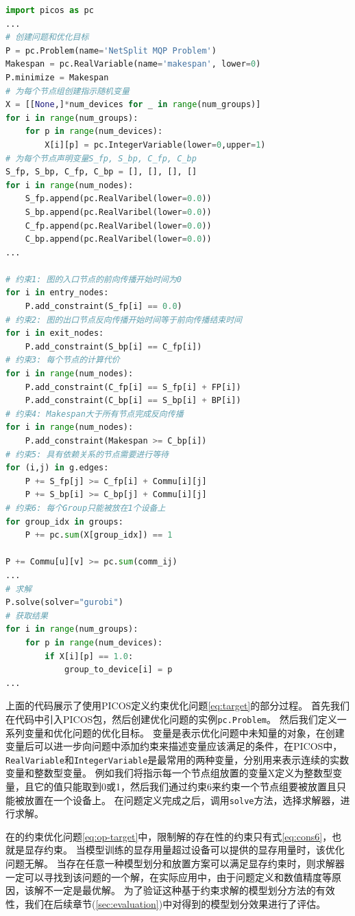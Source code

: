 \begin{lstlisting}[language=Python, caption={约束优化求解的Python实现}]
import picos as pc
...
# 创建问题和优化目标
P = pc.Problem(name='NetSplit MQP Problem')
Makespan = pc.RealVariable(name='makespan', lower=0)
P.minimize = Makespan
# 为每个节点组创建指示随机变量
X = [[None,]*num_devices for _ in range(num_groups)]
for i in range(num_groups):
	for p in range(num_devices):
		X[i][p] = pc.IntegerVariable(lower=0,upper=1)
# 为每个节点声明变量S_fp, S_bp, C_fp, C_bp
S_fp, S_bp, C_fp, C_bp = [], [], [], []
for i in range(num_nodes):
	S_fp.append(pc.RealVaribel(lower=0.0))
	S_bp.append(pc.RealVaribel(lower=0.0))
	C_fp.append(pc.RealVaribel(lower=0.0))
	C_bp.append(pc.RealVaribel(lower=0.0))
...

# 约束1: 图的入口节点的前向传播开始时间为0
for i in entry_nodes:
	P.add_constraint(S_fp[i] == 0.0)
# 约束2: 图的出口节点反向传播开始时间等于前向传播结束时间
for i in exit_nodes:
	P.add_constraint(S_bp[i] == C_fp[i])
# 约束3: 每个节点的计算代价
for i in range(num_nodes):
	P.add_constraint(C_fp[i] == S_fp[i] + FP[i])
	P.add_constraint(C_bp[i] == S_bp[i] + BP[i])
# 约束4: Makespan大于所有节点完成反向传播
for i in range(num_nodes):
	P.add_constraint(Makespan >= C_bp[i])
# 约束5: 具有依赖关系的节点需要进行等待
for (i,j) in g.edges:
    P += S_fp[j] >= C_fp[i] + Commu[i][j]
    P += S_bp[i] >= C_bp[j] + Commu[i][j]
# 约束6: 每个Group只能被放在1个设备上
for group_idx in groups:
    P += pc.sum(X[group_idx]) == 1

P += Commu[u][v] >= pc.sum(comm_ij) 
... 
# 求解
P.solve(solver="gurobi")
# 获取结果
for i in range(num_groups):
	for p in range(num_devices):
		if X[i][p] == 1.0:
			group_to_device[i] = p
...
\end{lstlisting}

上面的代码展示了使用PICOS定义约束优化问题\ref{eq:target}的部分过程。
首先我们在代码中引入PICOS包，然后创建优化问题的实例\texttt{pc.Problem}。
然后我们定义一系列变量和优化问题的优化目标。
变量是表示优化问题中未知量的对象，在创建变量后可以进一步向问题中添加约束来描述变量应该满足的条件，在PICOS中，\texttt{RealVariable}和\texttt{IntegerVariable}是最常用的两种变量，分别用来表示连续的实数变量和整数型变量。
例如我们将指示每一个节点组放置的变量X定义为整数型变量，且它的值只能取到0或1，然后我们通过约束6来约束一个节点组要被放置且只能被放置在一个设备上。
在问题定义完成之后，调用\texttt{solve}方法，选择求解器，进行求解。

在\sys{}的约束优化问题\ref{eq:op-target}中，限制解的存在性的约束只有式\ref{eq:cons6}，也就是显存约束。
当模型训练的显存用量超过设备可以提供的显存用量时，该优化问题无解。
当存在任意一种模型划分和放置方案可以满足显存约束时，则求解器一定可以寻找到该问题的一个解，在实际应用中，由于问题定义和数值精度等原因，该解不一定是最优解。
为了验证这种基于约束求解的模型划分方法的有效性，我们在后续章节(\ref{sec:evaluation})中对\sys{}得到的模型划分效果进行了评估。

